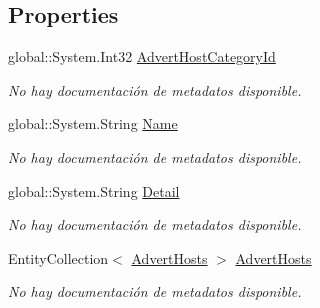 \subsection*{Properties}
\begin{DoxyCompactItemize}
\item 
global\-::\-System.\-Int32 \hyperlink{class_microsoft_1_1_samples_1_1_kinect_1_1_basic_interactions_1_1_advert_host_categories_a1820b0a4a08c0622ffaaa89c527e28ba}{Advert\-Host\-Category\-Id}
\begin{DoxyCompactList}\small\item\em No hay documentación de metadatos disponible. \end{DoxyCompactList}\item 
global\-::\-System.\-String \hyperlink{class_microsoft_1_1_samples_1_1_kinect_1_1_basic_interactions_1_1_advert_host_categories_ab9bd997ece4f19e8119a1088cfe96a37}{Name}
\begin{DoxyCompactList}\small\item\em No hay documentación de metadatos disponible. \end{DoxyCompactList}\item 
global\-::\-System.\-String \hyperlink{class_microsoft_1_1_samples_1_1_kinect_1_1_basic_interactions_1_1_advert_host_categories_a143577cd2c0a8d32db7d0ad18fe49495}{Detail}
\begin{DoxyCompactList}\small\item\em No hay documentación de metadatos disponible. \end{DoxyCompactList}\item 
Entity\-Collection$<$ \hyperlink{class_microsoft_1_1_samples_1_1_kinect_1_1_basic_interactions_1_1_advert_hosts}{Advert\-Hosts} $>$ \hyperlink{class_microsoft_1_1_samples_1_1_kinect_1_1_basic_interactions_1_1_advert_host_categories_a3ed88e0431c9b5c5209e19bf51abf73a}{Advert\-Hosts}
\begin{DoxyCompactList}\small\item\em No hay documentación de metadatos disponible. \end{DoxyCompactList}\end{DoxyCompactItemize}


